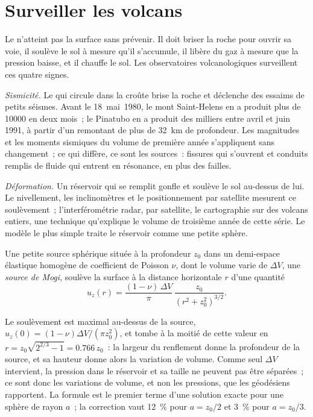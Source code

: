 \section{Surveiller les volcans}

Le  n'atteint pas la surface sans prévenir. Il doit briser la roche pour ouvrir
sa voie, il soulève le sol à mesure qu'il s'accumule, il libère du gaz à mesure que la pression
baisse, et il chauffe le sol. Les observatoires volcanologiques surveillent ces quatre signes.

\emph{Sismicité.} Le  qui circule dans la croûte brise la roche et déclenche des essaims
de petits séismes. Avant le 18~mai~1980, le mont Saint-Helens en a produit plus de
\num{10000} en deux mois~; le Pinatubo en a produit des milliers entre avril et
juin 1991, à partir d'un  remontant de plus de \qty{32}{km} de profondeur. Les magnitudes
et les moments sismiques du volume de première année s'appliquent sans changement~; ce qui diffère,
ce sont les sources~: fissures qui s'ouvrent et conduits remplis de fluide qui entrent en résonance, en plus des failles.

\emph{Déformation.} Un réservoir qui se remplit gonfle et soulève le sol au-dessus de lui.
Le nivellement, les inclinomètres et le positionnement par satellite mesurent ce soulèvement~; l'interférométrie
radar, par satellite, le cartographie sur des volcans entiers, une technique qu'explique le volume de troisième année de cette série. Le modèle le plus simple
traite le réservoir comme une petite sphère.

\begin{proposition}\label{prop:b2:eruptive-styles:mogi}
Une petite source sphérique située à la profondeur $z_0$ dans un demi-espace élastique homogène
de coefficient de Poisson $\nu$, dont le volume varie de $\Delta V$, une
\emph{source de Mogi}, soulève la surface à la distance horizontale $r$
d'une quantité
\[
u_z(r) = \frac{(1 - \nu)\,\Delta V}{\pi}\,\frac{z_0}{(r^2 + z_0^2)^{3/2}} .
\]
\end{proposition}
\admitted

Le soulèvement est maximal au-dessus de la source, $u_z(0) = (1 - \nu)\Delta V/(\pi z_0^2)$, et
tombe à la moitié de cette valeur en $r = z_0\sqrt{2^{2/3} - 1} = 0.766\,z_0$~: la largeur du
renflement donne la profondeur de la source, et sa hauteur donne alors la variation de volume.
Comme seul $\Delta V$ intervient, la pression dans le réservoir et sa taille ne peuvent pas être
séparées~; ce sont donc les variations de volume, et non les pressions, que les géodésiens
rapportent. La formule est le premier terme d'une solution exacte pour une sphère de rayon
$a$~; la correction vaut \qty{12}{\percent} pour $a = z_0/2$ et \qty{3}{\percent}
pour $a = z_0/3$.

